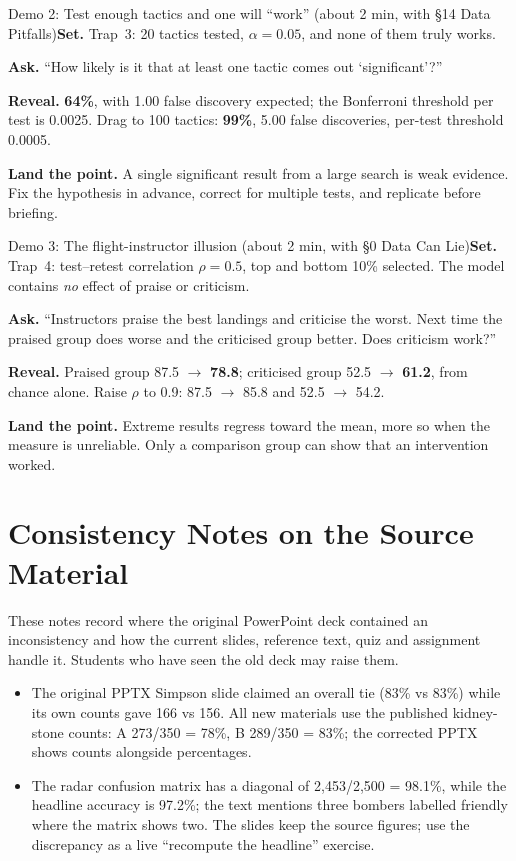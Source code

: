 \documentclass[11pt]{article}
\begin{document}
\begin{live}{Demo 2: Test enough tactics and one will ``work'' (about 2 min, with \S14 Data Pitfalls)}\textbf{Set.} Trap~3: 20 tactics tested, $\alpha=0.05$, and none of them truly works.\par\smallskip\textbf{Ask.} ``How likely is it that at least one tactic comes out `significant'?''\par\smallskip\textbf{Reveal.} \textbf{64\%}, with 1.00 false discovery expected; the Bonferroni threshold per test is 0.0025. Drag to 100 tactics: \textbf{99\%}, 5.00 false discoveries, per-test threshold 0.0005.\par\smallskip\textbf{Land the point.} A single significant result from a large search is weak evidence. Fix the hypothesis in advance, correct for multiple tests, and replicate before briefing.\end{live}

\begin{live}{Demo 3: The flight-instructor illusion (about 2 min, with \S0 Data Can Lie)}\textbf{Set.} Trap~4: test--retest correlation $\rho=0.5$, top and bottom 10\% selected. The model contains \emph{no} effect of praise or criticism.\par\smallskip\textbf{Ask.} ``Instructors praise the best landings and criticise the worst. Next time the praised group does worse and the criticised group better. Does criticism work?''\par\smallskip\textbf{Reveal.} Praised group 87.5 $\rightarrow$ \textbf{78.8}; criticised group 52.5 $\rightarrow$ \textbf{61.2}, from chance alone. Raise $\rho$ to 0.9: 87.5 $\rightarrow$ 85.8 and 52.5 $\rightarrow$ 54.2.\par\smallskip\textbf{Land the point.} Extreme results regress toward the mean, more so when the measure is unreliable. Only a comparison group can show that an intervention worked.\end{live}

\section{Consistency Notes on the Source Material}These notes record where the original PowerPoint deck contained an inconsistency and how the current slides, reference text, quiz and assignment handle it. Students who have seen the old deck may raise them.\begin{itemize}\item The original PPTX Simpson slide claimed an overall tie (83\% vs 83\%) while its own counts gave 166 vs 156. All new materials use the published kidney-stone counts: A 273/350 = 78\%, B 289/350 = 83\%; the corrected PPTX shows counts alongside percentages.\item The radar confusion matrix has a diagonal of 2,453/2,500 = 98.1\%, while the headline accuracy is 97.2\%; the text mentions three bombers labelled friendly where the matrix shows two. The slides keep the source figures; use the discrepancy as a live ``recompute the headline'' exercise.\end{itemize}
\end{document}
